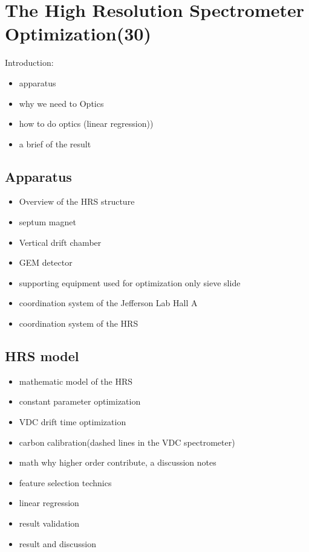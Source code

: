   \chapter{The High Resolution Spectrometer Optimization(30)}

Introduction:
\begin{itemize}
    \item apparatus
    \item why we need to Optics 
    \item how to do optics (linear regression))
    \item a brief of the result
\end{itemize}


\section{Apparatus}

\begin{itemize}
    \item Overview of the HRS structure
    \item septum magnet 
    \item Vertical drift chamber 
    \item GEM detector
    \item supporting equipment used for optimization only sieve slide

    \item coordination system of the Jefferson Lab Hall A
    \item coordination system of the HRS
\end{itemize}


\section{HRS model}

\begin{itemize}
    \item mathematic model of the HRS
    \item constant parameter optimization
    \item VDC drift time optimization
    \item carbon calibration(dashed lines in the VDC spectrometer)
    \item math why higher order contribute, a discussion notes
    \item feature selection technics
    \item linear regression
    \item result validation
    \item result and discussion
\end{itemize}

